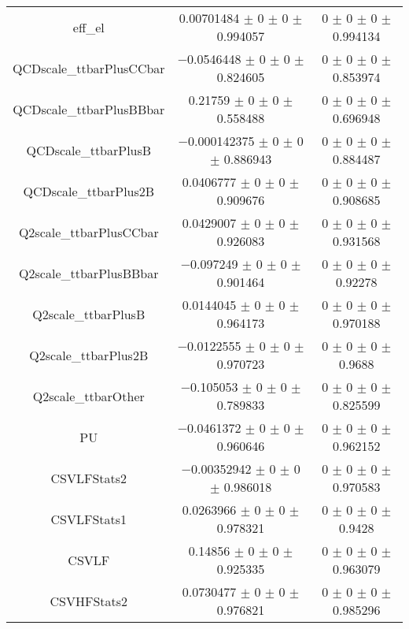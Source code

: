 \begin{table}
\begin{tabular}{ccc}
eff\_el & \num{0.00701484} $\pm$ \num{0} $\pm$ \num{0} $\pm$ \num{0.994057} & \num{0} $\pm$ \num{0} $\pm$ \num{0} $\pm$ \num{0.994134}\\
QCDscale\_ttbarPlusCCbar & \num{-0.0546448} $\pm$ \num{0} $\pm$ \num{0} $\pm$ \num{0.824605} & \num{0} $\pm$ \num{0} $\pm$ \num{0} $\pm$ \num{0.853974}\\
QCDscale\_ttbarPlusBBbar & \num{0.21759} $\pm$ \num{0} $\pm$ \num{0} $\pm$ \num{0.558488} & \num{0} $\pm$ \num{0} $\pm$ \num{0} $\pm$ \num{0.696948}\\
QCDscale\_ttbarPlusB & \num{-0.000142375} $\pm$ \num{0} $\pm$ \num{0} $\pm$ \num{0.886943} & \num{0} $\pm$ \num{0} $\pm$ \num{0} $\pm$ \num{0.884487}\\
QCDscale\_ttbarPlus2B & \num{0.0406777} $\pm$ \num{0} $\pm$ \num{0} $\pm$ \num{0.909676} & \num{0} $\pm$ \num{0} $\pm$ \num{0} $\pm$ \num{0.908685}\\
Q2scale\_ttbarPlusCCbar & \num{0.0429007} $\pm$ \num{0} $\pm$ \num{0} $\pm$ \num{0.926083} & \num{0} $\pm$ \num{0} $\pm$ \num{0} $\pm$ \num{0.931568}\\
Q2scale\_ttbarPlusBBbar & \num{-0.097249} $\pm$ \num{0} $\pm$ \num{0} $\pm$ \num{0.901464} & \num{0} $\pm$ \num{0} $\pm$ \num{0} $\pm$ \num{0.92278}\\
Q2scale\_ttbarPlusB & \num{0.0144045} $\pm$ \num{0} $\pm$ \num{0} $\pm$ \num{0.964173} & \num{0} $\pm$ \num{0} $\pm$ \num{0} $\pm$ \num{0.970188}\\
Q2scale\_ttbarPlus2B & \num{-0.0122555} $\pm$ \num{0} $\pm$ \num{0} $\pm$ \num{0.970723} & \num{0} $\pm$ \num{0} $\pm$ \num{0} $\pm$ \num{0.9688}\\
Q2scale\_ttbarOther & \num{-0.105053} $\pm$ \num{0} $\pm$ \num{0} $\pm$ \num{0.789833} & \num{0} $\pm$ \num{0} $\pm$ \num{0} $\pm$ \num{0.825599}\\
PU & \num{-0.0461372} $\pm$ \num{0} $\pm$ \num{0} $\pm$ \num{0.960646} & \num{0} $\pm$ \num{0} $\pm$ \num{0} $\pm$ \num{0.962152}\\
CSVLFStats2 & \num{-0.00352942} $\pm$ \num{0} $\pm$ \num{0} $\pm$ \num{0.986018} & \num{0} $\pm$ \num{0} $\pm$ \num{0} $\pm$ \num{0.970583}\\
CSVLFStats1 & \num{0.0263966} $\pm$ \num{0} $\pm$ \num{0} $\pm$ \num{0.978321} & \num{0} $\pm$ \num{0} $\pm$ \num{0} $\pm$ \num{0.9428}\\
CSVLF & \num{0.14856} $\pm$ \num{0} $\pm$ \num{0} $\pm$ \num{0.925335} & \num{0} $\pm$ \num{0} $\pm$ \num{0} $\pm$ \num{0.963079}\\
CSVHFStats2 & \num{0.0730477} $\pm$ \num{0} $\pm$ \num{0} $\pm$ \num{0.976821} & \num{0} $\pm$ \num{0} $\pm$ \num{0} $\pm$ \num{0.985296}\\

\end{tabular}
\end{table}
